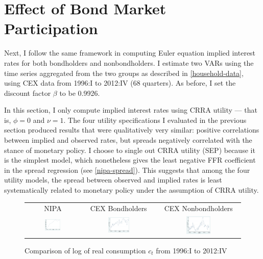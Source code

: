 \section{Effect of Bond Market Participation}
Next, I follow the same framework in computing Euler equation implied interest rates for both bondholders and nonbondholders. I estimate two VARs using the time series aggregated from the two groups as described in \autoref{household-data}, using CEX data from 1996:I to 2012:IV (68 quarters). As before, I set the discount factor $\beta$ to be 0.9926.

In this section, I only compute implied interest rates using CRRA utility --- that is, $\phi = 0$ and $\nu = 1$. The four utility specifications I evaluated in the previous section produced results that were qualitatively very similar: positive correlations between implied and observed rates, but spreads negatively correlated with the stance of monetary policy. I choose to single out CRRA utility (SEP) because it is the simplest model, which nonetheless gives the least negative FFR coefficient in the spread regression (see \autoref{nipa-spread}). This suggests that among the four utility models, the spread between observed and implied rates is least systematically related to monetary policy under the assumption of CRRA utility.

\begin{figure}[b]
\centering
\captionsetup{singlelinecheck=false, justification=centering}
\begin{tabular}{ccc}
NIPA & CEX Bondholders & CEX Nonbondholders \\
\includegraphics[width=0.31\textwidth]{figs/nipa/log_consumption} &
\includegraphics[width=0.31\textwidth]{figs/cex/log_consumption_bh} &
\includegraphics[width=0.31\textwidth]{figs/cex/log_consumption_nbh}
\end{tabular}
\caption{Comparison of log of real consumption $c_t$ from 1996:I to 2012:IV}
\label{log-consumption-series}
\end{figure}

